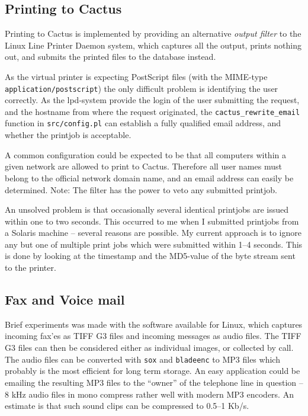 \subsection{Printing to Cactus}

Printing to Cactus is implemented by providing an alternative
\textit{output filter} to the Linux Line Printer Daemon system, which
captures all the output, prints nothing out, and submits the printed
files to the database instead.

As the virtual printer is expecting PostScript files (with the
MIME-type \texttt{application/postscript}) the only difficult problem
is identifying the user correctly.  As the lpd-system provide the
login of the user submitting the request, and the hostname from where
the request originated, the \texttt{cactus_rewrite_email} function in
\texttt{src/config.pl} can establish a fully qualified email address,
and whether the printjob is acceptable.

A common configuration could be expected to be that all computers
within a given network are allowed to print to Cactus.  Therefore all
user names must belong to the official network domain name, and an
email address can easily be determined.  Note:  The filter has the
power to veto any submitted printjob.

An unsolved problem is that occasionally several identical printjobs
are issued within one to two seconds.  This occurred to me when I
submitted printjobs from a Solaris machine -- several reasons are
possible.  My current approach is to ignore any but one of multiple
print jobs which were submitted within 1--4 seconds.  This is done by
looking at the timestamp and the MD5-value of the byte stream sent to
the printer.


\subsection{Fax and Voice mail}

Brief experiments was made with the
software available for Linux, which captures incoming fax'es as TIFF
G3 files and incoming messages as audio files.  The TIFF G3 files can
then be considered either as individual images, or collected by call.
The audio files can be converted with \texttt{sox} and
\texttt{bladeenc} to MP3 files which probably is the most efficient
for long term storage.  An easy application could be emailing the
resulting MP3 files to the ``owner'' of the telephone line in
question -- 8 kHz audio files in mono compress rather well with modern
MP3 encoders.  An estimate is that such sound clips can be compressed
to 0.5--1 Kb/s.

